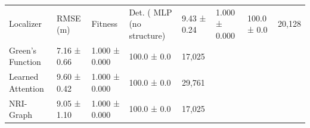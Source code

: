 \begin{tabular}{lllll}
\toprule
Localizer & RMSE (m) & Fitness & Det. (%
\midrule
MLP (no structure) & 9.43 ± 0.24 & 1.000 ± 0.000 & 100.0 ± 0.0 & 20,128 \\
Green's Function & 7.16 ± 0.66 & 1.000 ± 0.000 & 100.0 ± 0.0 & 17,025 \\
Learned Attention & 9.60 ± 0.42 & 1.000 ± 0.000 & 100.0 ± 0.0 & 29,761 \\
NRI-Graph & 9.05 ± 1.10 & 1.000 ± 0.000 & 100.0 ± 0.0 & 17,025 \\
\bottomrule
\end{tabular}
